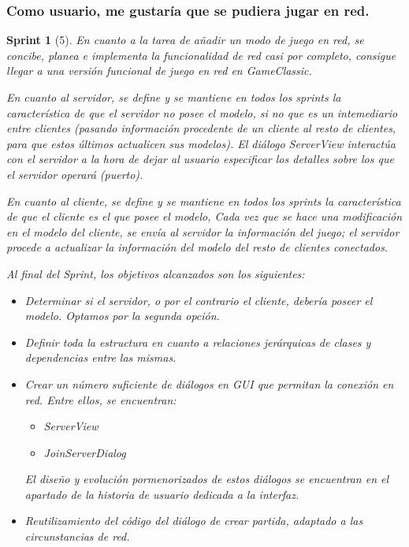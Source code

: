 \documentclass[12pt,a4paper,openright]{book}
\theoremstyle{break}
\newtheorem*{sprint}{Sprint}
\begin{document}
\newpage

\subsubsection{Como usuario, me gustaría que se pudiera jugar en red.}
\begin{sprint}[5]
En cuanto a la tarea de añadir un modo de juego en red, se concibe, planea e implementa la funcionalidad de red casi por completo, consigue llegar a una versión funcional de juego en red en GameClassic.

En cuanto al servidor, se define y se mantiene en todos los sprints la característica de que el servidor no posee el modelo, si no que es un intemediario entre clientes (pasando información procedente de un cliente al resto de clientes, para que estos últimos actualicen sus modelos). El diálogo ServerView interactúa con el servidor a la hora de dejar al usuario especificar los detalles sobre los que el servidor operará (puerto).

En cuanto al cliente, se define y se mantiene en todos los sprints la característica de que el cliente es el que posee el modelo, Cada vez que se hace una modificación en el modelo del cliente, se envía al servidor la información del juego; el servidor procede a actualizar la información del modelo del resto de clientes conectados.

Al final del Sprint, los objetivos alcanzados son los siguientes:

\begin{itemize}
\item Determinar si el servidor, o por el contrario el cliente, debería poseer el modelo. Optamos por la segunda opción.

\item Definir toda la estructura en cuanto a relaciones jerárquicas de clases y dependencias entre las mismas.

\item Crear un número suficiente de diálogos en GUI que permitan la conexión en red. Entre ellos, se encuentran:
\begin{itemize}
\item ServerView
\item JoinServerDialog
\end{itemize}

El diseño y evolución pormenorizados de estos diálogos se encuentran en el apartado de la historia de usuario dedicada a la interfaz.

\item Reutilizamiento del código del diálogo de crear partida, adaptado a las circunstancias de red.


\end{itemize}
\end{sprint}
\end{document}
